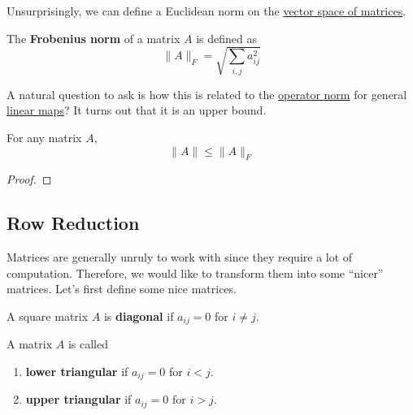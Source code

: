 	Unsurprisingly, we can define a Euclidean norm on the \hyperref[thm:vector-space-of-matrices]{vector space of matrices}.

	\begin{definition}
	  \label{def:frobenius-norm}
	  The \textbf{Frobenius norm} of a matrix $A$ is defined as 
		\begin{equation}
			\|A\|_F = \sqrt{\sum_{i, j} a_{ij}^2}
		\end{equation}
	\end{definition}

	A natural question to ask is how this is related to the \hyperref[def:operator-norm]{operator norm} for general \hyperref[def:linear_map]{linear maps}? It turns out that it is an upper bound. 

	\begin{theorem}
	  \label{thm:frobenius-norm-vs-operator-norm}
	  For any matrix $A$, 
		\begin{equation}
		  \|A\| \leq \|A\|_F
		\end{equation}
	\end{theorem}
	\begin{proof}
	  
	\end{proof}

\subsection{Row Reduction}

	Matrices are generally unruly to work with since they require a lot of computation. Therefore, we would like to transform them into some ``nicer'' matrices. Let's first define some nice matrices. 

	\begin{definition}
	  \label{def:diagonal-matrix}
		A square matrix $A$ is \textbf{diagonal} if $a_{i j} = 0$ for $i \neq j$. 
	\end{definition}

	\begin{definition}
	  \label{def:triangular-matrices}
    A matrix $A$ is called 
		\begin{enumerate}
		  \item \textbf{lower triangular} if $a_{i j} = 0$ for $i < j$. 
			\item \textbf{upper triangular} if $a_{i j} = 0$ for $i > j$. 
		\end{enumerate}
  \end{definition}

